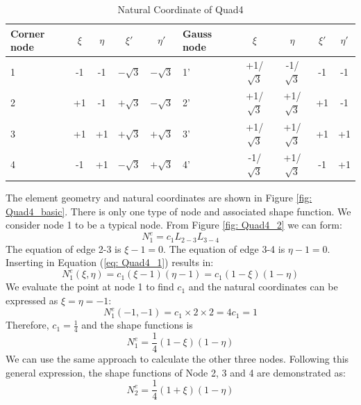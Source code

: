 \begin{table}
	\centering
	\caption{Natural Coordinate of Quad4}
	\label{tab: Quad4}
	\begin{tabular}{p{1cm}ccccp{1cm}cccc}			
		\hline
		Corner node\centering& $\xi$& $\eta$& $\xi'$& $\eta'$& Gauss node\centering& $\xi$& $\eta$& $\xi'$& $\eta'$ \\
		\hline
		1\centering& -1& -1& $-\sqrt{3}$& $-\sqrt{3}$& 1'\centering& +1/$\sqrt{3}$& -1/$\sqrt{3}$& -1& -1 \\
		2\centering& +1& -1& $+\sqrt{3}$& $-\sqrt{3}$& 2'\centering& +1/$\sqrt{3}$& +1/$\sqrt{3}$& +1& -1 \\
		3\centering& +1& +1& $+\sqrt{3}$& $+\sqrt{3}$& 3'\centering& +1/$\sqrt{3}$& +1/$\sqrt{3}$& +1& +1\\
		4\centering& -1& +1& $-\sqrt{3}$& $+\sqrt{3}$& 4'\centering& -1/$\sqrt{3}$& +1/$\sqrt{3}$& -1& +1\\
		\hline
	\end{tabular}
\end{table}		
The element geometry and natural coordinates are shown in Figure \ref{fig: Quad4_basic}. There is only one type of node and associated shape function. We consider node 1 to be a typical node. From Figure \ref{fig: Quad4_2} we can form:
\begin{equation} \label{eq: Quad4_1}
N_1^e = c_1L_{2-3}L_{3-4}
\end{equation}
The equation of edge 2-3 is $\xi - 1 = 0$. The equation of edge 3-4 is $\eta - 1 = 0$. Inserting in Equation (\ref{eq: Quad4_1}) results in:
\begin{equation}
N_1^e\left(\xi, \eta\right) = c_1 \left( \xi -1 \right) \left( \eta - 1\right) = c_1 \left(1 - \xi\right) \left( 1 - \eta \right)
\end{equation}
We evaluate the point at node 1 to find $c_1$ and the natural coordinates can be expressed as $\xi = \eta = -1$:
\begin{equation}
N_1^e \left(-1, -1 \right) = c_1 \times 2 \times 2 = 4c_1 = 1
\end{equation}
Therefore, $c_1 = \frac{1}{4}$ and the shape functions is
\begin{equation}
N_1^e = \frac{1}{4} \left(1 - \xi\right) \left( 1 - \eta\right)
\end{equation}
We can use the same approach to calculate the other three nodes. Following this general expression, the shape functions of Node 2, 3 and 4 are demonstrated as:
\begin{equation}
N_2^e = \frac{1}{4} \left(1 + \xi\right) \left( 1 - \eta\right)
\end{equation}
